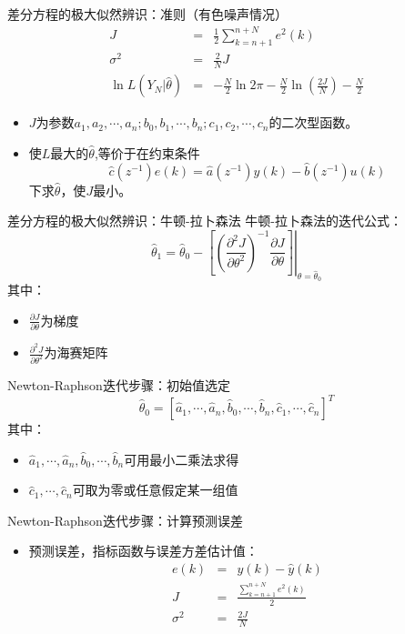 \begin{frame}{差分方程的极大似然辨识：准则（有色噪声情况）}
\begin{eqnarray*}
J &=& \frac{1}{2}\sum_{k=n+1}^{n+N}e^2(k)  \\
\sigma^2 &=& \frac{2}{N}J  \\
\ln L(Y_N|\hat{\theta}) &=& - \frac{N}{2}\ln{2\pi}-\frac{N}{2}\ln(\frac{2J}{N})-\frac{N}{2}
\end{eqnarray*}
\begin{itemize}
\item $J$为参数$a_1,a_2,\cdots,a_n;b_0,b_1,\cdots,b_n;c_1,c_2,\cdots,c_n $的二次型函数。
\item 使$L$最大的$\hat\theta$,等价于在约束条件
$$
\hat c(z^{-1})e(k)=\hat a(z^{-1})y(k)-\hat b(z^{-1})u(k)
$$
下求$\hat\theta$，使$J$最小。
\end{itemize}
\end{frame}

\begin{frame}{差分方程的极大似然辨识：牛顿-拉卜森法}
牛顿-拉卜森法的迭代公式：
$$
\hat\theta_1=\hat\theta_0-\left.\left[\left(\frac{\partial^2J}{\partial\theta^2}\right)^{-1}\frac{\partial J}{\partial\theta}\right]\right|_{\theta=\hat\theta_0}
$$
其中：
\begin{itemize}
\item $\frac{\partial J}{\partial\theta}$为梯度
\item $\frac{\partial^2J}{\partial\theta^2}$为海赛矩阵
\end{itemize}
\end{frame}


\begin{frame}{Newton-Raphson迭代步骤：初始值选定}
$$
\hat\theta_0=[\hat a_1,\cdots,\hat a_n,\hat b_0,\cdots,\hat b_n,\hat c_1,\cdots,\hat c_n]^T
$$
其中：
\begin{itemize}
\item  $\hat a_1,\cdots,\hat a_n,\hat b_0,\cdots,\hat b_n$可用最小二乘法求得
\item  $\hat c_1,\cdots,\hat c_n$可取为零或任意假定某一组值
\end{itemize}
\end{frame}

\begin{frame}{Newton-Raphson迭代步骤：计算预测误差}
\begin{itemize}
\item   预测误差，指标函数与误差方差估计值：
\begin{eqnarray*}
e(k) &=& y(k)-\hat y(k)   \\
J &=& \frac{\sum_{k=n+1}^{n+N}e^2(k)}{2}    \\
\sigma^2 &=& \frac{2J}{N}
\end{eqnarray*}
\end{itemize}
\end{frame}


